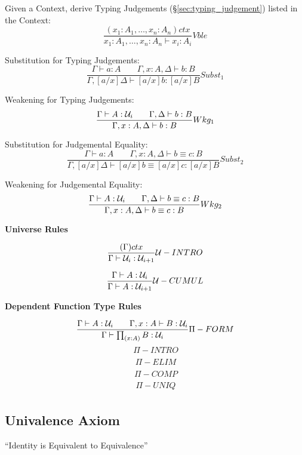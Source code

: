 Given a Context, derive Typing Judgements
(\S\ref{sec:typing_judgement}) listed in the Context:
\[
  {
    \frac
    {(x_1:A_1, \ldots, x_n:A_n)ctx}
    {x_1:A_1, \ldots, x_n:A_n \vdash x_i:A_i}
  } Vble
\]

Substitution for Typing Judgements:
\[
  {
    \frac
    {\Gamma \vdash a : A \;\;\;\;\;\;\;
    \Gamma,x:A,\Delta \vdash b : B}
    {\Gamma,[a/x]\Delta \vdash [a/x]b : [a/x]B}
  } Subst_1
\]

Weakening for Typing Judgements:
\[
  {
    \frac
    {\Gamma \vdash A : \mathcal{U}_i \;\;\;\;\;\;\;
    \Gamma,\Delta \vdash b : B}
    {\Gamma,x:A,\Delta \vdash b:B}
  } Wkg_1
\]

Substitution for Judgemental Equality:
\[
  {
    \frac
    {\Gamma \vdash a : A \;\;\;\;\;\;\;
    \Gamma,x:A,\Delta \vdash b \equiv c : B}
    {\Gamma,[a/x]\Delta \vdash [a/x]b \equiv [a/x]c : [a/x]B}
  } Subst_2
\]

Weakening for Judgemental Equality:
\[
  {
    \frac
    {\Gamma \vdash A : \mathcal{U}_i \;\;\;\;\;\;\;
    \Gamma,\Delta \vdash b \equiv c : B}
    {\Gamma, x:A, \Delta \vdash b \equiv c : B}
  } Wkg_2
\]



\textbf{Universe Rules}

\[
  {
    \frac
    {(\Gamma) ctx}
    {\Gamma \vdash \mathcal{U}_i : \mathcal{U}_{i+1}}
  } \mathcal{U}-INTRO
\]

\[
  {
    \frac
    {\Gamma \vdash A : \mathcal{U}_i}
    {\Gamma \vdash A : \mathcal{U}_{i+1}}
  } \mathcal{U}-CUMUL
\]



\textbf{Dependent Function Type Rules}

\[
  {
    \frac
    {\Gamma \vdash A : \mathcal{U}_i \;\;\;\;\;\;\;
    \Gamma,x:A \vdash B : \mathcal{U}_i}
    {\Gamma \vdash \prod_{(x:A)} B : \mathcal{U}_i}
  } \Pi-FORM
\]\[
  {
    \frac
    {}
    {}
  } \Pi-INTRO
\]\[
  {
    \frac
    {}
    {}
  } \Pi-ELIM
\]\[
  {
    \frac
    {}
    {}
  } \Pi-COMP
\]\[
  {
    \frac
    {}
    {}
  } \Pi-UNIQ
\]



\subsection{Univalence Axiom}\label{sec:univalence_axiom}

``Identity is Equivalent to Equivalence''

